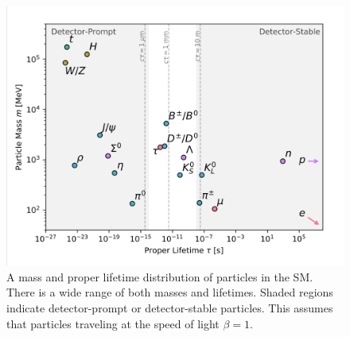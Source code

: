 \begin{figure}[htbp]
\centering
\includegraphics[width=.8\textwidth]{figures/theory/LLP-mass-lifetime.png}
\caption{A mass and proper lifetime distribution of particles in the \ac{SM}. There is a wide range of both masses and lifetimes. Shaded regions indicate detector-prompt or detector-stable particles. This assumes that particles traveling at the speed of light $\beta = 1$.}
\label{fig:trking_d0_eff}
\end{figure}


